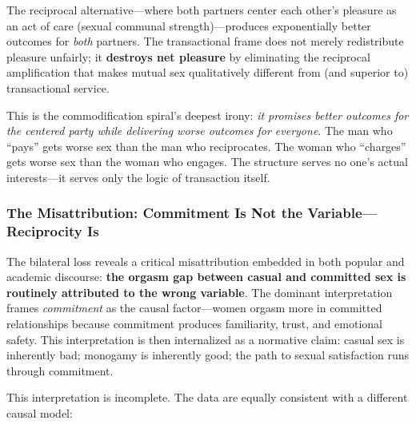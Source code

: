 \documentclass[12pt, letterpaper]{article}
\begin{document}
The reciprocal alternative---where both partners center each other's pleasure as an act of care (sexual communal strength)---produces exponentially better outcomes for \textit{both} partners. The transactional frame does not merely redistribute pleasure unfairly; it \textbf{destroys net pleasure} by eliminating the reciprocal amplification that makes mutual sex qualitatively different from (and superior to) transactional service.

This is the commodification spiral's deepest irony: \textit{it promises better outcomes for the centered party while delivering worse outcomes for everyone}. The man who ``pays'' gets worse sex than the man who reciprocates. The woman who ``charges'' gets worse sex than the woman who engages. The structure serves no one's actual interests---it serves only the logic of transaction itself.

\subsubsection{The Misattribution: Commitment Is Not the Variable---Reciprocity Is}

The bilateral loss reveals a critical misattribution embedded in both popular and academic discourse: \textbf{the orgasm gap between casual and committed sex is routinely attributed to the wrong variable}. The dominant interpretation frames \textit{commitment} as the causal factor---women orgasm more in committed relationships because commitment produces familiarity, trust, and emotional safety. This interpretation is then internalized as a normative claim: casual sex is inherently bad; monogamy is inherently good; the path to sexual satisfaction runs through commitment.

This interpretation is incomplete. The data are equally consistent with a different causal model:
\end{document}
